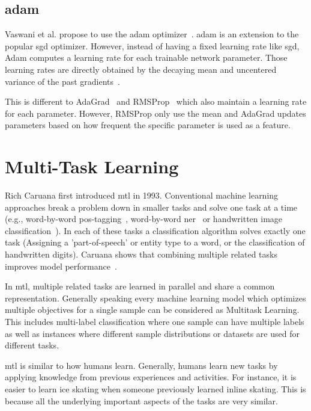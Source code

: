 \subsection{\gls{adam}}

Vaswani et al. propose to use the \acrfull{adam} optimizer~\cite{Kingma2014}. \gls{adam} is an extension to the popular \gls{sgd} optimizer. However, instead of having a fixed learning rate like \gls{sgd}, Adam computes a learning rate for each trainable network parameter. Those learning rates are directly obtained by the decaying mean and uncentered variance of the past gradients~\cite{Kingma2014}.
\medskip

This is different to AdaGrad~\cite{Duchi2011} and RMSProp~\cite{Hinton} which also maintain a learning rate for each parameter. However, RMSProp only use the mean and AdaGrad updates parameters based on how frequent the specific parameter is used as a feature.

\section{Multi-Task Learning}

Rich Caruana first introduced \acrfull{mtl} in 1993. Conventional machine learning approaches break a problem down in smaller tasks and solve one task at a time (e.g., word-by-word \gls{pos}-tagging~\cite{Toutanova2007}, word-by-word \gls{ner}~\cite{Sang2003} or handwritten image classification~\cite{LeCun;1990}). In each of these tasks a classification algorithm solves exactly one task (Assigning a 'part-of-speech' or entity type to a word, or the classification of handwritten digits). Caruana shows that combining multiple related tasks improves model performance~\cite{Caruana1993}\cite{Caruana1997a}. 

In \gls{mtl}, multiple related tasks are learned in parallel and share a common representation. Generally speaking every machine learning model which optimizes multiple objectives for a single sample can be considered as Multitask Learning. This includes multi-label classification where one sample can have multiple labels as well as instances where different sample distributions or datasets are used for different tasks.

\gls{mtl} is similar to how humans learn. Generally, humans learn new tasks by applying knowledge from previous experiences and activities. For instance, it is easier to learn ice skating when someone previously learned inline skating. This is because all the underlying important aspects of the tasks are very similar.

